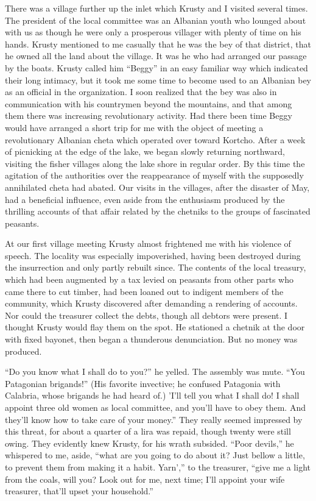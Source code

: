 \documentclass[a5paper,12pt]{book}
\begin{document}
There was a village further up the inlet which Krusty and I visited several times. The president of the local committee was an Albanian youth who lounged about with us as though he were only a prosperous villager with plenty of time on his hands. Krusty mentioned to me casually that he was the bey of that district, that he owned all the land about the village. It was he who had arranged our passage by the boats. Krusty called him “Beggy” in an easy familiar way which indicated their long intimacy, but it took me some time to become used to an Albanian bey as an official in the organization. I soon realized that the bey was also in communication with his countrymen beyond the mountains, and that among them there was increasing revolutionary activity. Had there been time Beggy would have arranged a short trip for me with the object of meeting a revolutionary Albanian cheta which operated over toward Kortcho.
After a week of picnicking at the edge of the lake, we began slowly returning northward, visiting the fisher villages along the lake shore in regular order. By this time the agitation of the authorities over the reappearance of myself with the supposedly annihilated cheta had abated. Our visits in the villages, after the disaster of May, had a beneficial influence, even aside from the enthusiasm produced by the thrilling accounts of that affair related by the chetniks to the groups of fascinated peasants.

At our first village meeting Krusty almost frightened me with his violence of speech. The locality was especially impoverished, having been destroyed during the insurrection and only partly rebuilt since. The contents of the local treasury, which had been augmented by a tax levied on peasants from other parts who came there to cut timber, had been loaned out to indigent members of the community, which Krusty discovered after demanding a rendering of accounts. Nor could the treasurer collect the debts, though all debtors were present. I thought Krusty would flay them on the spot. He stationed a chetnik at the door with fixed bayonet, then began a thunderous denunciation. But no money was produced.

“Do you know what I shall do to you?” he yelled. The assembly was mute. “You Patagonian brigands!” (His favorite invective; he confused Patagonia with Calabria, whose brigands he had heard of.) 'I'll tell you what I shall do! I shall appoint three old women as local committee, and you’ll have to obey them. And they’ll know how to take care of your money.” They really seemed impressed by this threat, for about a quarter of a lira was repaid, though twenty were still owing. They evidently knew Krusty, for his wrath subsided. “Poor devils,” he whispered to me, aside, “what are you going to do about it? Just bellow a little, to prevent them from making it a habit. Yarn’,” to the treasurer, “give me a light from the coals, will you? Look out for me, next time; I’ll appoint your wife treasurer, that’ll upset your household.”
\end{document}
